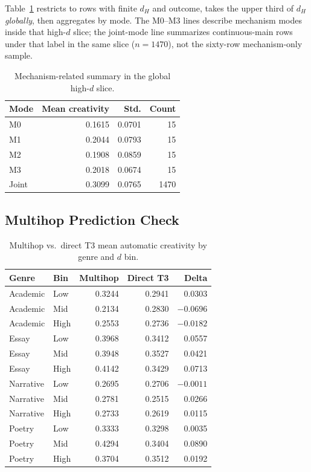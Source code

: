 \documentclass[sigconf,nonacm]{acmart}
\begin{document}
Table~\ref{tab:mechanism} restricts to rows with finite $d_H$ and outcome, takes the upper third of $d_H$ \emph{globally}, then aggregates by mode. The M0--M3 lines describe mechanism modes inside that high-$d$ slice; the joint-mode line summarizes continuous-main rows under that label in the same slice ($n{=}1470$), not the sixty-row mechanism-only sample.

\begin{table}[t]
\centering
\small
\begin{tabular}{lrrr}
\toprule
Mode & Mean creativity & Std. & Count \\
\midrule
M0 & 0.1615 & 0.0701 & 15 \\
M1 & 0.2044 & 0.0793 & 15 \\
M2 & 0.1908 & 0.0859 & 15 \\
M3 & 0.2018 & 0.0674 & 15 \\
Joint & 0.3099 & 0.0765 & 1470 \\
\bottomrule
\end{tabular}
\caption{Mechanism-related summary in the global high-$d$ slice.}
\label{tab:mechanism}
\end{table}

\subsection{Multihop Prediction Check}

\begin{table}[t]
\centering
\small
\begin{tabular}{llrrr}
\toprule
Genre & Bin & Multihop & Direct T3 & Delta \\
\midrule
Academic & Low & 0.3244 & 0.2941 & 0.0303 \\
Academic & Mid & 0.2134 & 0.2830 & $-0.0696$ \\
Academic & High & 0.2553 & 0.2736 & $-0.0182$ \\
Essay & Low & 0.3968 & 0.3412 & 0.0557 \\
Essay & Mid & 0.3948 & 0.3527 & 0.0421 \\
Essay & High & 0.4142 & 0.3429 & 0.0713 \\
Narrative & Low & 0.2695 & 0.2706 & $-0.0011$ \\
Narrative & Mid & 0.2781 & 0.2515 & 0.0266 \\
Narrative & High & 0.2733 & 0.2619 & 0.0115 \\
Poetry & Low & 0.3333 & 0.3298 & 0.0035 \\
Poetry & Mid & 0.4294 & 0.3404 & 0.0890 \\
Poetry & High & 0.3704 & 0.3512 & 0.0192 \\
\bottomrule
\end{tabular}
\caption{Multihop vs.\ direct T3 mean automatic creativity by genre and $d$ bin.}
\label{tab:multihop}
\end{table}
\end{document}
